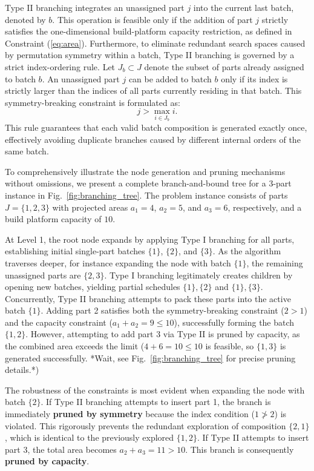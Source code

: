 \documentclass[letterpaper, 10 pt, conference]{ieeeconf}  %
\begin{document}
Type II branching integrates an unassigned part $j$ into the current last batch, denoted by $b$. This operation is feasible only if the addition of part $j$ strictly satisfies the one-dimensional build-platform capacity restriction, as defined in Constraint (\ref{eq:area}). Furthermore, to eliminate redundant search spaces caused by permutation symmetry within a batch, Type II branching is governed by a strict index-ordering rule. Let $J_b \subset J$ denote the subset of parts already assigned to batch $b$. An unassigned part $j$ can be added to batch $b$ only if its index is strictly larger than the indices of all parts currently residing in that batch. This symmetry-breaking constraint is formulated as:
\begin{equation}
    j > \max_{i \in J_b} i. \label{eq:node_sym}
\end{equation}
This rule guarantees that each valid batch composition is generated exactly once, effectively avoiding duplicate branches caused by different internal orders of the same batch.

To comprehensively illustrate the node generation and pruning mechanisms without omissions, we present a complete branch-and-bound tree for a 3-part instance in Fig.~\ref{fig:branching_tree}. The problem instance consists of parts $J=\{1, 2, 3\}$ with projected areas $a_1=4$, $a_2=5$, and $a_3=6$, respectively, and a build platform capacity of $10$.

At Level 1, the root node expands by applying Type I branching for all parts, establishing initial single-part batches $\{1\}$, $\{2\}$, and $\{3\}$. As the algorithm traverses deeper, for instance expanding the node with batch $\{1\}$, the remaining unassigned parts are $\{2, 3\}$. Type I branching legitimately creates children by opening new batches, yielding partial schedules $\{1\}, \{2\}$ and $\{1\}, \{3\}$. Concurrently, Type II branching attempts to pack these parts into the active batch $\{1\}$. Adding part 2 satisfies both the symmetry-breaking constraint ($2 > 1$) and the capacity constraint ($a_1 + a_2 = 9 \le 10$), successfully forming the batch $\{1, 2\}$. However, attempting to add part 3 via Type II is pruned by capacity, as the combined area exceeds the limit ($4 + 6 = 10 \le 10$ is feasible, so $\{1,3\}$ is generated successfully. *Wait, see Fig.~\ref{fig:branching_tree} for precise pruning details.*)

The robustness of the constraints is most evident when expanding the node with batch $\{2\}$. If Type II branching attempts to insert part 1, the branch is immediately \textbf{pruned by symmetry} because the index condition ($1 \ngtr 2$) is violated. This rigorously prevents the redundant exploration of composition $\{2, 1\}$, which is identical to the previously explored $\{1, 2\}$. If Type II attempts to insert part 3, the total area becomes $a_2 + a_3 = 11 > 10$. This branch is consequently \textbf{pruned by capacity}.
\end{document}
